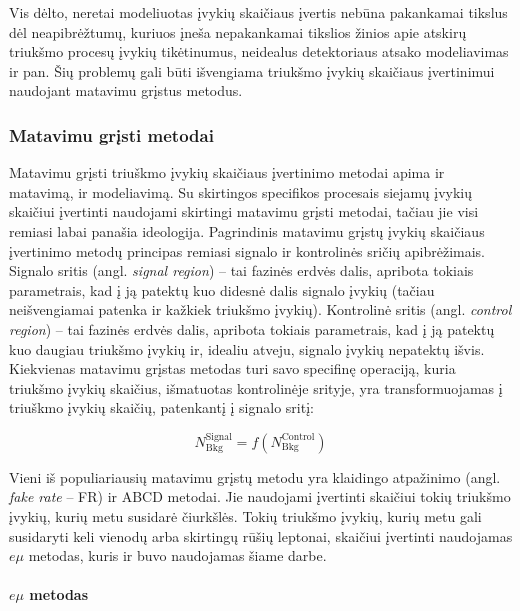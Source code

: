 \documentclass[a4paper, 12pt]{article}
\newcommand{\emu}{e\mu}
\newlength\q
\begin{document}
Vis dėlto, neretai modeliuotas įvykių skaičiaus įvertis nebūna pakankamai tikslus dėl neapibrėžtumų,
kuriuos įneša nepakankamai tikslios žinios apie atskirų triukšmo procesų įvykių tikėtinumus,
neidealus detektoriaus atsako modeliavimas ir pan.
Šių problemų gali būti išvengiama triukšmo įvykių skaičiaus įvertinimui naudojant matavimu
grįstus metodus.

\subsubsection*{Matavimu grįsti metodai}

Matavimu grįsti triuškmo įvykių skaičiaus įvertinimo metodai apima ir matavimą, ir modeliavimą.
Su skirtingos specifikos procesais siejamų įvykių skaičiui įvertinti naudojami skirtingi
matavimu grįsti metodai, tačiau jie visi remiasi labai panašia ideologija.
Pagrindinis matavimu grįstų įvykių skaičiaus įvertinimo metodų principas remiasi signalo ir
kontrolinės sričių apibrėžimais.
Signalo sritis (angl. \textit{signal region}) -- tai fazinės erdvės dalis, apribota tokiais
parametrais, kad į ją patektų kuo didesnė dalis signalo įvykių (tačiau neišvengiamai patenka
ir kažkiek triukšmo įvykių).
Kontrolinė sritis (angl. \textit{control region}) -- tai fazinės erdvės dalis, apribota
tokiais parametrais, kad į ją patektų kuo daugiau triukšmo įvykių ir, idealiu atveju, signalo
įvykių nepatektų išvis.
Kiekvienas matavimu grįstas metodas turi savo specifinę operaciją, kuria triukšmo įvykių skaičius,
išmatuotas kontrolinėje srityje, yra transformuojamas į triuškmo įvykių skaičių, patenkantį į
signalo sritį:

\begin{equation}
	N_{\mathrm{Bkg}}^{\mathrm{Signal}} = f( N_{\mathrm{Bkg}}^{\mathrm{Control}} )
	\label{eq:data-driven}
\end{equation}

Vieni iš populiariausių matavimu grįstų metodu yra klaidingo atpažinimo (angl.
\textit{fake rate} -- FR) ir ABCD metodai.
Jie naudojami įvertinti skaičiui tokių triukšmo įvykių, kurių metu susidarė čiurkšlės.
Tokių triukšmo įvykių, kurių metu gali susidaryti keli vienodų arba skirtingų
rūšių leptonai, skaičiui įvertinti naudojamas $\emu$ metodas, kuris ir buvo naudojamas šiame
darbe.

\paragraph{$e\mu$ metodas\\}
\end{document}
